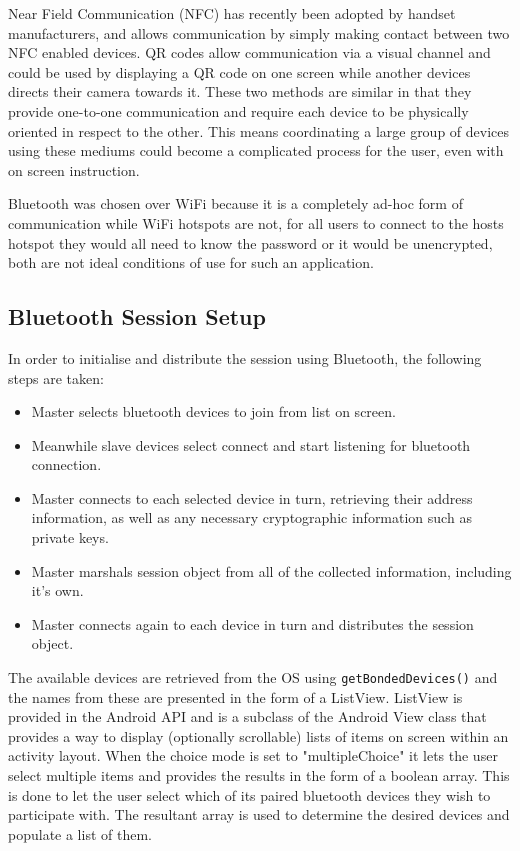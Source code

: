 Near Field Communication (NFC) has recently been adopted by handset manufacturers, and allows communication by simply making contact between two NFC enabled devices. QR codes allow communication via a visual channel and could be used by displaying a QR code on one screen while another devices directs their camera towards it. These two methods are similar in that they provide one-to-one communication and require each device to be physically oriented in respect to the other. This means coordinating a large group of devices using these mediums could become a complicated process for the user, even with on screen instruction.

Bluetooth was chosen over WiFi because it is a completely ad-hoc form of communication while WiFi hotspots are not, for all users to connect to the hosts hotspot they would all need to know the password or it would be unencrypted, both are not ideal conditions of use for such an application.

\subsection{Bluetooth Session Setup}
\label{bt setup}
In order to initialise and distribute the session using Bluetooth, the following steps are taken:

\begin{itemize}
\item{Master selects bluetooth devices to join from list on screen.}
\item{Meanwhile slave devices select connect and start listening for bluetooth connection.}
\item{Master connects to each selected device in turn, retrieving their address information, as well as any necessary cryptographic information such as private keys.}
\item{Master marshals session object from all of the collected information, including it's own.}
\item{Master connects again to each device in turn and distributes the session object.}
\end{itemize}

The available devices are retrieved from the OS using {\tt getBondedDevices()} and the names from these are presented in the form of a ListView. ListView is provided in the Android API and is a subclass of the Android View class that provides a way to display (optionally scrollable) lists of items on screen within an activity layout. When the choice mode is set to "multipleChoice" it lets the user select multiple items and provides the results in the form of a boolean array. This is done to let the user select which of its paired bluetooth devices they wish to participate with. The resultant array is used to determine the desired devices and populate a list of them.

